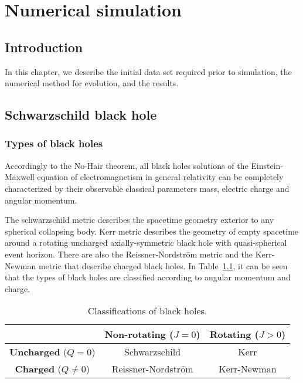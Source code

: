 
\chapter{Numerical simulation} %

\label{Chapter3} %

\section{Introduction}

In this chapter, we describe the initial data set required prior to simulation, the numerical method for evolution, and the results.

\section{Schwarzschild black hole}
\subsection{Types of black holes}
Accordingly to the No-Hair theorem, all black holes solutions of the Einstein-Maxwell equation of electromagnetism in general relativity can be completely characterized by their observable classical parameters mass, electric charge and angular momentum.

The schwarzschild metric describes the spacetime geometry exterior to any spherical collapsing body. Kerr metric describes the geometry of empty spacetime around a rotating uncharged axially-symmetric black hole with quasi-spherical event horizon. There are also the Reissner-Nordström metric and the Kerr-Newman metric that describe charged black holes\parencite{vindana2018simulation, wald2010general}. In Table~\ref{tab:typeofblackholes}, it can be seen that the types of black holes are classified according to angular momentum and charge.
\begin{table}[H]
	\caption{Classifications of black holes.}
	\label{tab:typeofblackholes}
	\centering
	\begin{tabular}{c | c c}
		\toprule
		 & \textbf{Non-rotating} ($J=0$) & \textbf{Rotating} ($J>0$) \\
		\midrule
		\textbf{Uncharged} ($Q=0$) & Schwarzschild & Kerr\\
		\textbf{Charged}	($Q\neq0$) & Reissner-Nordström & Kerr-Newman\\
		\bottomrule
	\end{tabular}
\end{table}

